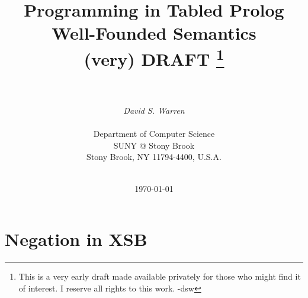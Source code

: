 \documentclass[11pt]{report}
\begin{document}
\title{\bf Programming in Tabled Prolog \\ Well-Founded Semantics \\ (very) DRAFT
\footnote{This is a very early draft made available privately for
those who might find it of interest.  I reserve all rights to this
work. -dsw}
}

\author{%
        \ \\ \ \\
        {\em David S. Warren} \\ 
        \ \\
        {Department of Computer Science} \\
        {SUNY @ Stony Brook} \\
        {Stony Brook, NY 11794-4400, U.S.A.} \\
        \ \\
} 

\date{\today}

\maketitle



\thispagestyle{empty}
%
\newpage

  

\chapter{Negation in XSB}





\end{document}
